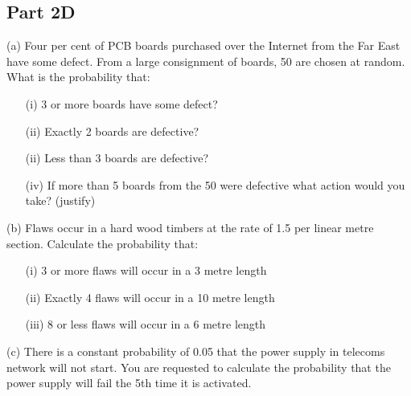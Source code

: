 

\subsection*{Part 2D}


(a)  	Four  per cent of PCB boards purchased over the Internet from the Far East have some defect.  
From a large consignment of boards, 50 are chosen at random.  
What is the probability that:
\begin{itemize}
\item[(i)]  	3 or more boards have some defect?
\item[(ii)]  	Exactly 2 boards are defective?
\item[(ii)]  	Less than 3 boards are defective?
\item[(iv)]  	If more than 5 boards from the 50 were defective what action would you take? (justify)
\end{itemize} 
(b) 	Flaws occur in a hard wood timbers  at the rate of 1.5 per linear  metre section.  Calculate the probability that:
\begin{itemize}
\item[(i)]  	3 or more flaws will occur in a 3  metre length 
\item[(ii)]  	Exactly 4 flaws will occur in a 10 metre length
\item[(iii)]  	8 or less flaws will occur in a 6  metre length 
\end{itemize} 

(c)	There is a constant probability of 0.05  that the power supply in telecoms network will not start.  
You are requested to calculate the probability that the power supply will fail the 5th time it is activated.
